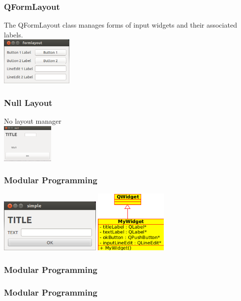 \frame
{
\frametitle{QFormLayout}
The QFormLayout class manages forms of input widgets and their associated labels.\\
\includegraphics[width=100pt]{img/formlayout.png}\\
{\tiny

}
}

\frame
{
\frametitle{Null Layout}
No layout manager\\
\includegraphics[width=72pt]{code/qt/null/xylayout.png}\\
{\tiny

}
}

\begin{frame}[fragile]
\frametitle{Modular Programming}
\includegraphics[width=140pt]{img/simple.png}
\hspace{4mm}
\includegraphics[width=100pt]{img/simplecd.png}
\end{frame}

\begin{frame}[fragile]
\frametitle{Modular Programming}
{\tiny

}
\end{frame}

\begin{frame}[fragile]
\frametitle{Modular Programming}
{\tiny

}
\end{frame}

